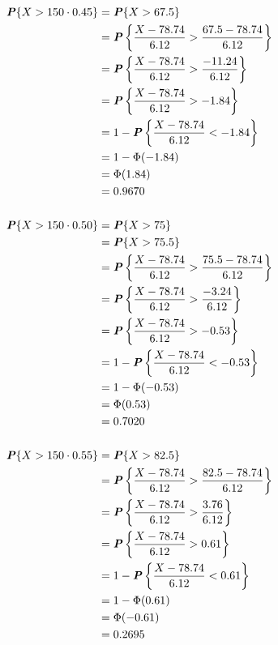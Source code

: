 \documentclass[12pt]{article}
\newcommand{\boldP}{\textbf{\textit{P}}}
\begin{document}
\begin{align*}
  \boldP\{X > 150 \cdot 0.45\}
    &= \boldP\{X > 67.5\} \\
    &= \boldP \left\{ \frac{X - 78.74}{6.12}
                    > \frac{67.5 - 78.74}{6.12} \right\} \\
    &= \boldP \left\{ \frac{X - 78.74}{6.12}
                    > \frac{-11.24}{6.12} \right\} \\
    &= \boldP \left\{ \frac{X - 78.74}{6.12} > -1.84 \right\} \\
    &= 1 - \boldP \left\{ \frac{X - 78.74}{6.12} < -1.84 \right\} \\
    &= 1 - \Phi(-1.84) \\
    &= \Phi(1.84) \\
    &= 0.9670 \\
\\
  \boldP\{X > 150 \cdot 0.50\}
    &= \boldP\{X > 75\} \\
    &= \boldP\{X > 75.5\} \\
    &= \boldP \left\{ \frac{X - 78.74}{6.12}
                    > \frac{75.5 - 78.74}{6.12} \right\} \\
    &= \boldP \left\{ \frac{X - 78.74}{6.12}
                    > \frac{-3.24}{6.12} \right\} \\
    &= \boldP \left\{ \frac{X - 78.74}{6.12} > -0.53 \right\} \\
    &= 1 - \boldP \left\{ \frac{X - 78.74}{6.12} < -0.53 \right\} \\
    &= 1 - \Phi(-0.53) \\
    &= \Phi(0.53) \\
    &= 0.7020 \\
\\
  \boldP\{X > 150 \cdot 0.55\}
    &= \boldP\{X > 82.5\} \\
    &= \boldP \left\{ \frac{X - 78.74}{6.12}
                    > \frac{82.5 - 78.74}{6.12} \right\} \\
    &= \boldP \left\{ \frac{X - 78.74}{6.12}
                    > \frac{3.76}{6.12} \right\} \\
    &= \boldP \left\{ \frac{X - 78.74}{6.12} > 0.61 \right\} \\
    &= 1 - \boldP \left\{ \frac{X - 78.74}{6.12} < 0.61 \right\} \\
    &= 1 - \Phi(0.61) \\
    &= \Phi(-0.61) \\
    &= 0.2695
\end{align*}
\end{document}
